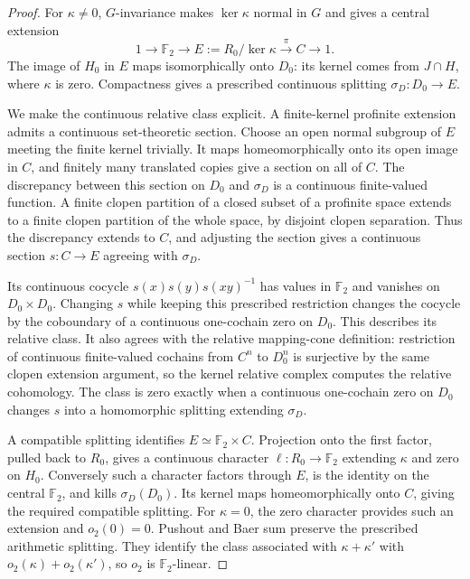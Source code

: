 \begin{proof}
For \(\kappa\ne0\), \(G\)-invariance makes \(\ker\kappa\)
normal in \(G\) and gives a central extension
\[
 1\longrightarrow\mathbb F_2
   \longrightarrow E:=R_0/\ker\kappa
   \xrightarrow{\pi}C\longrightarrow1.
\]
The image of \(H_0\) in \(E\) maps isomorphically onto
\(D_0\): its kernel comes from \(J\cap H\), where
\(\kappa\) is zero.
Compactness gives a prescribed continuous splitting
\(\sigma_D:D_0\to E\).

We make the continuous relative class explicit.
A finite-kernel profinite extension admits a continuous
set-theoretic section.
Choose an open normal subgroup of \(E\) meeting the finite
kernel trivially. It maps homeomorphically onto its open
image in \(C\), and finitely many translated copies give
a section on all of \(C\).
The discrepancy between this section on \(D_0\) and
\(\sigma_D\) is a continuous finite-valued function.
A finite clopen partition of a closed subset of a
profinite space extends to a finite clopen partition
of the whole space, by disjoint clopen separation.
Thus the discrepancy extends to \(C\), and adjusting
the section gives a continuous section \(s:C\to E\)
agreeing with \(\sigma_D\).

Its continuous cocycle
\(s(x)s(y)s(xy)^{-1}\) has values in \(\mathbb F_2\)
and vanishes on \(D_0\times D_0\).
Changing \(s\) while keeping this prescribed restriction
changes the cocycle by the coboundary of a continuous
one-cochain zero on \(D_0\).
This describes its relative class.
It also agrees with the relative mapping-cone definition:
restriction of continuous finite-valued cochains from
\(C^n\) to \(D_0^n\) is surjective by the same clopen
extension argument, so the kernel relative complex
computes the relative cohomology.
The class is zero exactly when a continuous
one-cochain zero on \(D_0\) changes \(s\) into a
homomorphic splitting extending \(\sigma_D\).

A compatible splitting identifies
\(E\simeq\mathbb F_2\times C\).
Projection onto the first factor, pulled back to \(R_0\),
gives a continuous character \(\ell:R_0\to\mathbb F_2\)
extending \(\kappa\) and zero on \(H_0\).
Conversely such a character factors through \(E\),
is the identity on the central \(\mathbb F_2\),
and kills \(\sigma_D(D_0)\).
Its kernel maps homeomorphically onto \(C\), giving
the required compatible splitting.
For \(\kappa=0\), the zero character provides such
an extension and \(o_2(0)=0\).
Pushout and Baer sum preserve the prescribed arithmetic
splitting. They identify the class associated with
\(\kappa+\kappa'\) with \(o_2(\kappa)+o_2(\kappa')\),
so \(o_2\) is \(\mathbb F_2\)-linear.


\end{proof}
